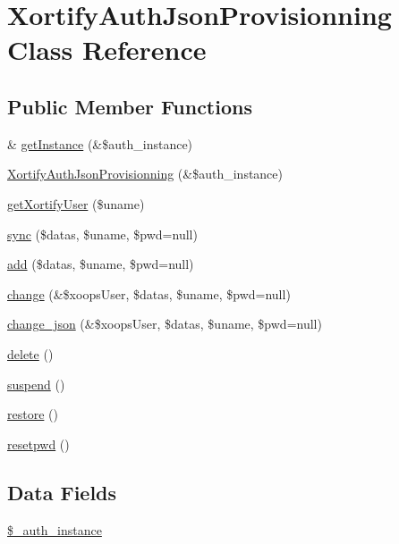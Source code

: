 \hypertarget{class_xortify_auth_json_provisionning}{\section{Xortify\-Auth\-Json\-Provisionning Class Reference}
\label{class_xortify_auth_json_provisionning}
}
\subsection*{Public Member Functions}
\begin{DoxyCompactItemize}
\item 
\& \hyperlink{class_xortify_auth_json_provisionning_a2c8eaa915c70d75289ac8a03686194f9}{get\-Instance} (\&\$auth\-\_\-instance)
\item 
\hyperlink{class_xortify_auth_json_provisionning_acaf0cac25f9cd967c0329db929627521}{Xortify\-Auth\-Json\-Provisionning} (\&\$auth\-\_\-instance)
\item 
\hyperlink{class_xortify_auth_json_provisionning_a041d726ac26672547ed1504e8e0117aa}{get\-Xortify\-User} (\$uname)
\item 
\hyperlink{class_xortify_auth_json_provisionning_a35dc08b0f2138eb818ff95345b73bcff}{sync} (\$datas, \$uname, \$pwd=null)
\item 
\hyperlink{class_xortify_auth_json_provisionning_adfc9fcef01e7bd7b2f47e8e79d51fc63}{add} (\$datas, \$uname, \$pwd=null)
\item 
\hyperlink{class_xortify_auth_json_provisionning_ae1f0971b9712c794620cf309164e43af}{change} (\&\$xoops\-User, \$datas, \$uname, \$pwd=null)
\item 
\hyperlink{class_xortify_auth_json_provisionning_a94f4e0408f26e65abca347ec883f4ec9}{change\-\_\-json} (\&\$xoops\-User, \$datas, \$uname, \$pwd=null)
\item 
\hyperlink{class_xortify_auth_json_provisionning_a13bdffdd926f26b825ea57066334ff01}{delete} ()
\item 
\hyperlink{class_xortify_auth_json_provisionning_ad73006a505121228f3b075c2409787d2}{suspend} ()
\item 
\hyperlink{class_xortify_auth_json_provisionning_aa1371f22826cf8cde4454c9b467203d0}{restore} ()
\item 
\hyperlink{class_xortify_auth_json_provisionning_a06d70fbd3a2db390b6f2530c0076628e}{resetpwd} ()
\end{DoxyCompactItemize}
\subsection*{Data Fields}
\begin{DoxyCompactItemize}
\item 
\hyperlink{class_xortify_auth_json_provisionning_a486ed878bb5a7188c99ac4c9ee46ac6e}{\$\-\_\-auth\-\_\-instance}
\end{DoxyCompactItemize}


